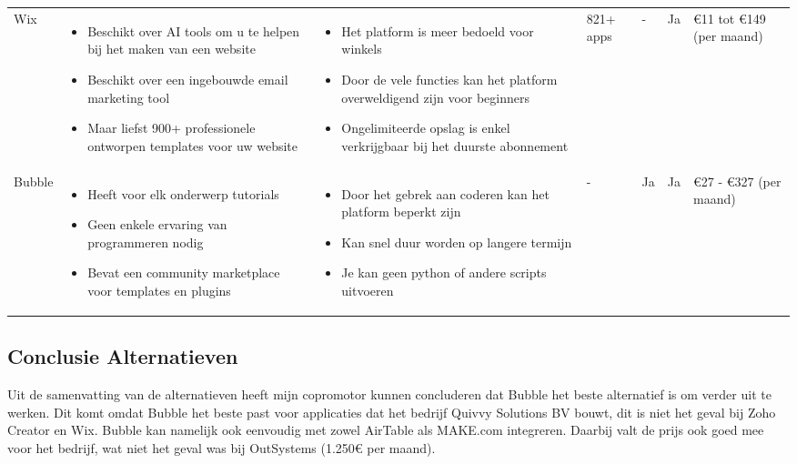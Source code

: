 \begin{longtable}{p{2.2cm} p{2.4cm} p{2.4cm} p{2.2cm} p{2.2cm} p{2.2cm} p{2.2cm}}
    Wix & 
    \begin{itemize}

        \item Beschikt over AI tools om u te helpen bij het maken van een website
        \item Beschikt over een ingebouwde email marketing tool
        \item Maar liefst 900+ professionele ontworpen templates voor uw website
    \end{itemize} & 
    \begin{itemize}
        \item Het platform is meer bedoeld voor winkels
        \item Door de vele functies kan het platform overweldigend zijn voor beginners
        \item Ongelimiteerde opslag is enkel verkrijgbaar bij het duurste abonnement
    \end{itemize} &
    821+ apps &
    - &
    Ja &
    €11 tot €149 (per maand)\\

    Bubble & 
    \begin{itemize}
        \item Heeft voor elk onderwerp tutorials
        \item Geen enkele ervaring van programmeren nodig
        \item Bevat een community marketplace voor templates en plugins
    \end{itemize} & 
    \begin{itemize}
        \item Door het gebrek aan coderen kan het platform beperkt zijn
        \item Kan snel duur worden op langere termijn
        \item Je kan geen python of andere scripts uitvoeren
    \end{itemize} &
    - &
    Ja &
    Ja &
    €27 - €327 (per maand)\\
\end{longtable}
\subsection{Conclusie Alternatieven}%
\label{subsec:conclusie-alternatieven}
Uit de samenvatting van de alternatieven heeft mijn copromotor kunnen concluderen dat Bubble het beste alternatief is om verder uit te werken.
Dit komt omdat Bubble het beste past voor applicaties dat het bedrijf Quivvy Solutions BV bouwt, dit is niet het geval bij Zoho Creator en Wix. 
Bubble kan namelijk ook eenvoudig met zowel AirTable als MAKE.com integreren. Daarbij valt de prijs ook goed mee voor het bedrijf, wat niet het geval was bij OutSystems (1.250€ per maand).
